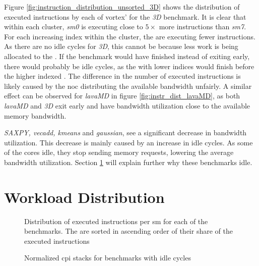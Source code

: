 Figure \ref{fig:instruction_distribution_unsorted_3D} shows the distribution of executed instructions by each of \Gls{vortex}'  for the \textit{3D} benchmark. It is clear that within each cluster, \textit{\acrshort{sm}0} is executing close to $5\times$ more instructions than \textit{\acrshort{sm}7}. For each increasing index within the cluster, the  are executing fewer instructions. As there are no idle cycles for \textit{3D}, this cannot be because less work is being allocated to the . If the benchmark would have finished instead of exiting early, there would probably be idle cycles, as the  with lower indices would finish before the higher indexed . The difference in the number of executed instructions is likely caused by the \acrshort{noc} distributing the available bandwidth unfairly. A similar effect can be observed for \textit{lavaMD} in figure \ref{fig:instr_dist_lavaMD}, as both \textit{lavaMD} and \textit{3D} exit early and have bandwidth utilization close to the available memory bandwidth.

\textit{SAXPY, vecadd, kmeans} and \textit{gaussian}, see a significant decrease in bandwidth utilization. This decrease is mainly caused by an increase in idle cycles. As some of the cores idle, they stop sending memory requests, lowering the average bandwidth utilization. Section \ref{sec:workload_dist} will explain further why these benchmarks idle.

\newpage
\section{Workload Distribution} \label{sec:workload_dist}

\begin{figure}

\caption[Distribution of executed instructions per \acrshort{sm}.]{Distribution of executed instructions per \acrshort{sm} for each of the benchmarks. The  are sorted in ascending order of their share of the executed instructions}
\label{fig:instruction_distribution}
\end{figure}

\begin{figure}
    \centering
    \caption{Normalized \acrshort{cpi} stacks for benchmarks with idle cycles}
    \label{fig:norm_cpi_idle}
\end{figure}

